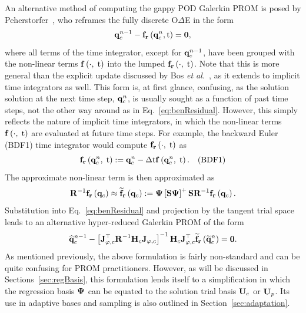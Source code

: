 An alternative method of computing the gappy POD Galerkin PROM is posed by Peherstorfer~\cite{Peherstorfer2020Adaptive}, who reframes the fully discrete O$\Delta$E in the form
%
\begin{equation}\label{eq:benResidual}
	\mathbf{q}_{c}^{n-1} - \mathbf{f}_{\mathbf{r}}\left(\mathbf{q}_{c}^{n}, \text{t}\right) = \mathbf{0},
\end{equation}
%
where all terms of the time integrator, except for $\mathbf{q}_{c}^{n - 1}$, have been grouped with the non-linear terms $\mathbf{f} \left(\cdot, \; \text{t}\right)$ into the lumped $\mathbf{f}_{\mathbf{r}}\left(\cdot, \; \text{t}\right)$. Note that this is more general than the explicit update discussed by Bos \textit{et al.}~\cite{Bos2004}, as it extends to implicit time integrators as well. This form is, at first glance, confusing, as the solution solution at the next time step, $\mathbf{q}_{c}^{n}$, is usually sought as a function of past time steps, not the other way around as in Eq.~\ref{eq:benResidual}. However, this simply reflects the nature of implicit time integrators, in which the non-linear terms $\mathbf{f} \left(\cdot, \; \text{t}\right)$ are evaluated at future time steps. For example, the backward Euler (BDF1) time integrator would compute $\mathbf{f}_{\mathbf{r}}\left(\cdot, \; \text{t}\right)$ as
%
\begin{equation}
	\mathbf{f}_{\mathbf{r}}\left(\mathbf{q}_{c}^{n}, \; \text{t}\right) := \mathbf{q}_{c}^{n} - \Delta \text{t} \mathbf{f} \left(\mathbf{q}_{c}^{n}, \; \text{t}\right). \quad \text{(BDF1)}
\end{equation}
%
The approximate non-linear term is then approximated as
%
\begin{equation}
	\resScaleInv \rhsResFunc{\consVec} \approx \rhsResApproxFunc{\consVec} \defEq \deimBasis \left[\sampMat \deimBasis \right]^+ \sampMat \resScaleInv \rhsResFunc{\consVec}.
\end{equation}
%
Substitution into Eq.~\ref{eq:benResidual} and projection by the tangent trial space leads to an alternative hyper-reduced Galerkin PROM of the form
%
\begin{equation}
    \consVecCoef^{\timeIdx-1} - \left[\jacobTrialCons^\top \resScaleInv \jacobDecodeCons\right]^{-1} \jacobDecodeCons^\top \rhsResApproxFunc{\consVecRom^{\timeIdx}} = \zeroVec.
\end{equation}
%
As mentioned previously, the above formulation is fairly non-standard and can be quite confusing for PROM practitioners. However, as will be discussed in Sections~\ref{sec:regBasis}, this formulation lends itself to a simplification in which the regression basis $\deimBasis$ can be equated to the solution trial basis $\consTrial$ or $\primTrial$. Its use in adaptive bases and sampling is also outlined in Section~\ref{sec:adaptation}.

